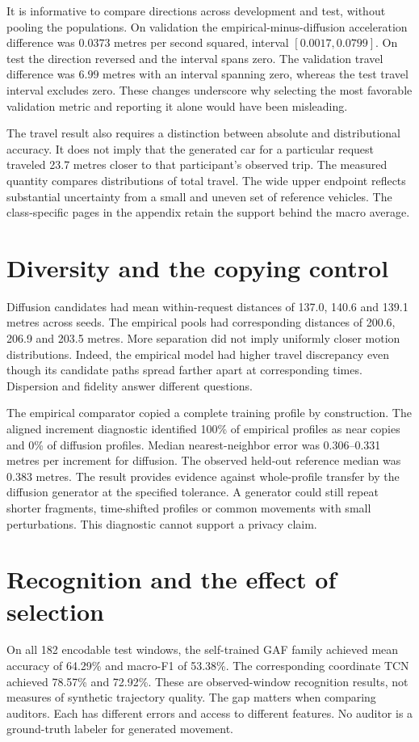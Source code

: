 It is informative to compare directions across development and test, without pooling the populations. On validation the empirical-minus-diffusion acceleration difference was $0.0373$ metres per second squared, interval $[0.0017,0.0799]$. On test the direction reversed and the interval spans zero. The validation travel difference was $6.99$ metres with an interval spanning zero, whereas the test travel interval excludes zero. These changes underscore why selecting the most favorable validation metric and reporting it alone would have been misleading.

The travel result also requires a distinction between absolute and distributional accuracy. It does not imply that the generated car for a particular request traveled 23.7 metres closer to that participant's observed trip. The measured quantity compares distributions of total travel. The wide upper endpoint reflects substantial uncertainty from a small and uneven set of reference vehicles. The class-specific pages in the appendix retain the support behind the macro average.



\section{Diversity and the copying control}
Diffusion candidates had mean within-request distances of 137.0, 140.6 and 139.1 metres across seeds. The empirical pools had corresponding distances of 200.6, 206.9 and 203.5 metres. More separation did not imply uniformly closer motion distributions. Indeed, the empirical model had higher travel discrepancy even though its candidate paths spread farther apart at corresponding times. Dispersion and fidelity answer different questions.

The empirical comparator copied a complete training profile by construction. The aligned increment diagnostic identified 100\% of empirical profiles as near copies and 0\% of diffusion profiles. Median nearest-neighbor error was 0.306--0.331 metres per increment for diffusion. The observed held-out reference median was 0.383 metres. The result provides evidence against whole-profile transfer by the diffusion generator at the specified tolerance. A generator could still repeat shorter fragments, time-shifted profiles or common movements with small perturbations. This diagnostic cannot support a privacy claim.

\section{Recognition and the effect of selection}
On all 182 encodable test windows, the self-trained GAF family achieved mean accuracy of 64.29\% and macro-F1 of 53.38\%. The corresponding coordinate TCN achieved 78.57\% and 72.92\%. These are observed-window recognition results, not measures of synthetic trajectory quality. The gap matters when comparing auditors. Each has different errors and access to different features. No auditor is a ground-truth labeler for generated movement.

